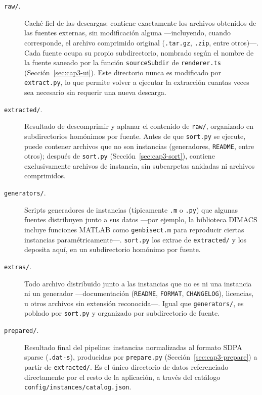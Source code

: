 \begin{description}
    \item[\texttt{raw/}.] Cach\'e fiel de las descargas: contiene
    exactamente los archivos obtenidos de las fuentes externas, sin
    modificaci\'on alguna —incluyendo, cuando corresponde, el archivo
    comprimido original (\texttt{.tar.gz}, \texttt{.zip}, entre otros)—. Cada
    fuente ocupa su propio subdirectorio, nombrado seg\'un el nombre de la
    fuente saneado por la funci\'on \texttt{sourceSubdir} de
    \texttt{renderer.ts} (Secci\'on~\ref{sec:cap3-ui}). Este directorio nunca
    es modificado por \texttt{extract.py}, lo que permite volver a ejecutar
    la extracci\'on cuantas veces sea necesario sin requerir una nueva
    descarga.
    \item[\texttt{extracted/}.] Resultado de descomprimir y aplanar el
    contenido de \texttt{raw/}, organizado en subdirectorios hom\'onimos por
    fuente. Antes de que \texttt{sort.py} se ejecute, puede contener archivos
    que no son instancias (generadores, \texttt{README}, entre otros); despu\'es
    de \texttt{sort.py} (Secci\'on~\ref{sec:cap3-sort}), contiene
    exclusivamente archivos de instancia, sin subcarpetas anidadas ni
    archivos comprimidos.
    \item[\texttt{generators/}.] Scripts generadores de instancias
    (t\'ipicamente \texttt{.m} o \texttt{.py}) que algunas fuentes distribuyen
    junto a sus datos —por ejemplo, la biblioteca DIMACS incluye funciones
    MATLAB como \texttt{genbisect.m} para reproducir ciertas instancias
    param\'etricamente—. \texttt{sort.py} los extrae de \texttt{extracted/} y
    los deposita aqu\'i, en un subdirectorio hom\'onimo por fuente.
    \item[\texttt{extras/}.] Todo archivo distribuido junto a las instancias
    que no es ni una instancia ni un generador —documentaci\'on
    (\texttt{README}, \texttt{FORMAT}, \texttt{CHANGELOG}), licencias, u otros
    archivos sin extensi\'on reconocida—. Igual que \texttt{generators/}, es
    poblado por \texttt{sort.py} y organizado por subdirectorio de fuente.
    \item[\texttt{prepared/}.] Resultado final del pipeline: instancias
    normalizadas al formato SDPA sparse (\texttt{.dat-s}), producidas por
    \texttt{prepare.py} (Secci\'on~\ref{sec:cap3-prepare}) a partir de
    \texttt{extracted/}. Es el \'unico directorio de datos referenciado
    directamente por el resto de la aplicaci\'on, a trav\'es del cat\'alogo
    \texttt{config/instances/catalog.json}.
\end{description}

